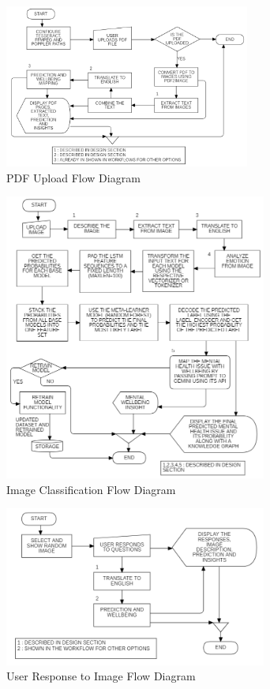 \begin{figure}[H]  
    \centering
    \includegraphics[width=0.72\textwidth]{Images/APP PDF.png}  
    \caption{PDF Upload Flow Diagram}
    \label{01234i}  %
\end{figure}

\pagebreak

\begin{figure}[H]  
    \centering
    \includegraphics[width=0.77\textwidth]{Images/APP IMAGE OPTION.png}  
    \caption{Image Classification Flow Diagram}
    \label{011232i}  %
\end{figure}

\begin{figure}[H]  
    \centering
    \includegraphics[width=0.77\textwidth]{Images/APP RESPOND.png}  
    \caption{User Response to Image Flow Diagram}
    \label{01234i}  %
\end{figure}

